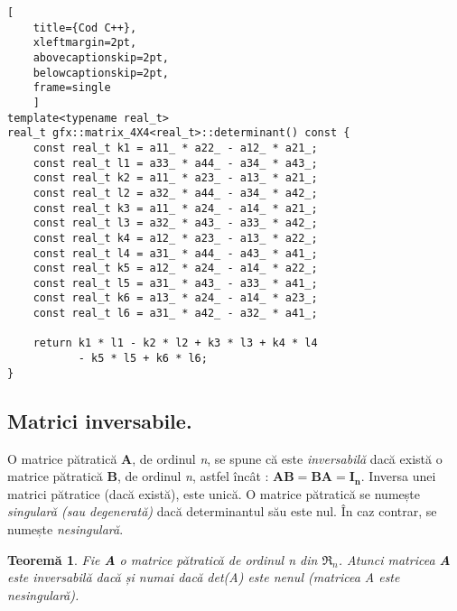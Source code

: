 \begin{lstlisting}[
    title={Cod C++}, 
    xleftmargin=2pt,
    abovecaptionskip=2pt,
    belowcaptionskip=2pt,
    frame=single
    ]
template<typename real_t>
real_t gfx::matrix_4X4<real_t>::determinant() const {
    const real_t k1 = a11_ * a22_ - a12_ * a21_;
    const real_t l1 = a33_ * a44_ - a34_ * a43_;
    const real_t k2 = a11_ * a23_ - a13_ * a21_;
    const real_t l2 = a32_ * a44_ - a34_ * a42_;
    const real_t k3 = a11_ * a24_ - a14_ * a21_;
    const real_t l3 = a32_ * a43_ - a33_ * a42_;
    const real_t k4 = a12_ * a23_ - a13_ * a22_;
    const real_t l4 = a31_ * a44_ - a43_ * a41_;
    const real_t k5 = a12_ * a24_ - a14_ * a22_;
    const real_t l5 = a31_ * a43_ - a33_ * a41_;
    const real_t k6 = a13_ * a24_ - a14_ * a23_;
    const real_t l6 = a31_ * a42_ - a32_ * a41_;

    return k1 * l1 - k2 * l2 + k3 * l3 + k4 * l4 
           - k5 * l5 + k6 * l6;
}

\end{lstlisting}

\subsection{Matrici inversabile.}
\label{ch1:sec_matrix:sub_matrix_inverse}

O matrice pătratică \textbf{A}, de ordinul \textit{n}, se spune că este
\textit{inversabilă} dacă există o matrice pătratică \textbf{B}, de ordinul
\textit{n}, astfel încât : $\mathbf{AB = BA = I_{n}}$. Inversa unei matrici
pătratice (dacă există), este unică.
O matrice pătratică se numește \textit{singulară (sau degenerată)} dacă
determinantul său este nul. În caz contrar, se numește \textit{nesingulară}.

\newtheorem{th_matrixinverse}[th_detcompute]{Teoremă}
\label{theorem:matrix_inverse}
\begin{th_matrixinverse}
Fie \textbf{A} o matrice pătratică de ordinul \textit{n} din $\mathfrak{R}_{n}$.
Atunci matricea \textbf{A} este inversabilă dacă și numai dacă det(A) este nenul
(matricea A este nesingulară).
\end{th_matrixinverse}

